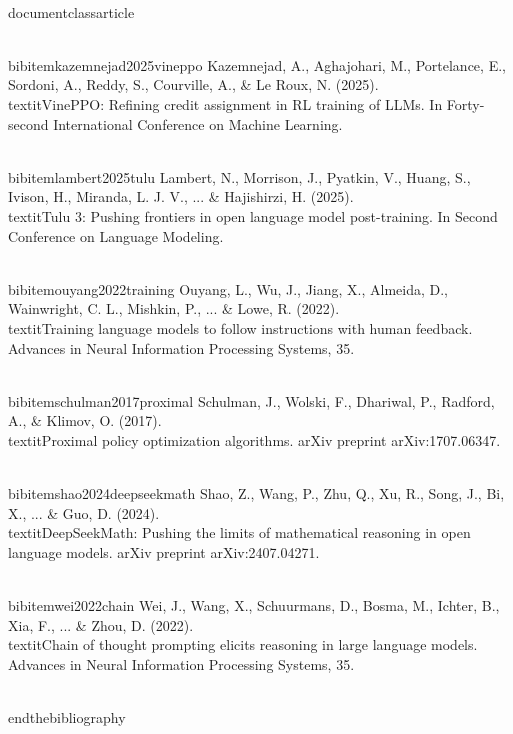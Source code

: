 \\documentclass{article}
\begin{document}
\\bibitem{kazemnejad2025vineppo}
Kazemnejad, A., Aghajohari, M., Portelance, E., Sordoni, A., Reddy, S., Courville, A., \& Le Roux, N. (2025).
\\textit{VinePPO: Refining credit assignment in RL training of LLMs}.
In Forty-second International Conference on Machine Learning.

\\bibitem{lambert2025tulu}
Lambert, N., Morrison, J., Pyatkin, V., Huang, S., Ivison, H., Miranda, L. J. V., ... \& Hajishirzi, H. (2025).
\\textit{Tulu 3: Pushing frontiers in open language model post-training}.
In Second Conference on Language Modeling.

\\bibitem{ouyang2022training}
Ouyang, L., Wu, J., Jiang, X., Almeida, D., Wainwright, C. L., Mishkin, P., ... \& Lowe, R. (2022).
\\textit{Training language models to follow instructions with human feedback}.
Advances in Neural Information Processing Systems, 35.

\\bibitem{schulman2017proximal}
Schulman, J., Wolski, F., Dhariwal, P., Radford, A., \& Klimov, O. (2017).
\\textit{Proximal policy optimization algorithms}.
arXiv preprint arXiv:1707.06347.

\\bibitem{shao2024deepseekmath}
Shao, Z., Wang, P., Zhu, Q., Xu, R., Song, J., Bi, X., ... \& Guo, D. (2024).
\\textit{DeepSeekMath: Pushing the limits of mathematical reasoning in open language models}.
arXiv preprint arXiv:2407.04271.

\\bibitem{wei2022chain}
Wei, J., Wang, X., Schuurmans, D., Bosma, M., Ichter, B., Xia, F., ... \& Zhou, D. (2022).
\\textit{Chain of thought prompting elicits reasoning in large language models}.
Advances in Neural Information Processing Systems, 35.

\\end{thebibliography}

\
\end{document}
